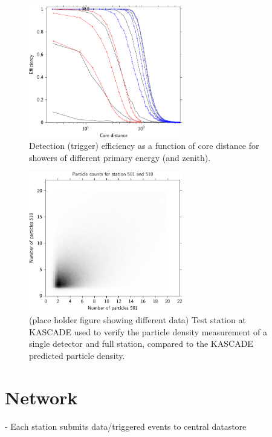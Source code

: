 \begin{figure}
    \centering
    \includegraphics[width=0.6\textwidth]
                    {plots/experiment/efficiency_two_16}
    \caption{Detection (trigger) efficiency as a function of core distance for showers of different primary energy (and zenith).}
    \label{fig:efficiency_two_16}
\end{figure}


\begin{figure}
    \centering
    \includegraphics[width=0.6\textwidth]
                    {plots/experiment/n_501_510_sum}
    \caption{(place holder figure showing different data) Test station at KASCADE used to verify the particle density measurement of a single detector and full station, compared to the KASCADE predicted particle density.}
    \label{fig:n_501_510_sum}
\end{figure}



\section{Network}


- Each station submits data/triggered events to central datastore

